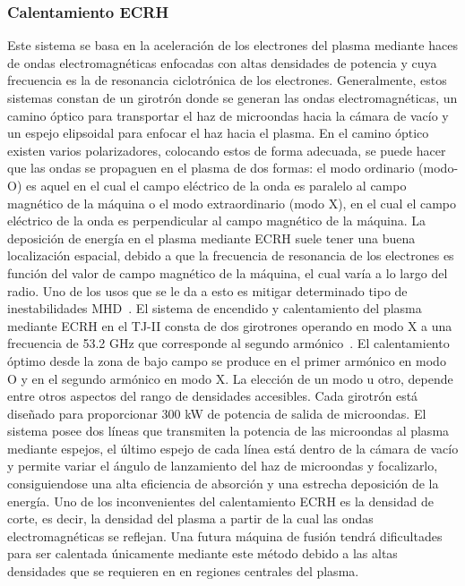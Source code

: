 \subsubsection*{Calentamiento ECRH}
Este sistema se basa en
la aceleración de los electrones del plasma mediante haces de ondas electromagnéticas enfocadas
con altas densidades de potencia y cuya frecuencia es la de resonancia ciclotrónica de
los electrones.
Generalmente, estos sistemas constan de un girotrón donde se generan las ondas electromagnéticas, 
un camino óptico para transportar el haz de microondas hacia la cámara de
vacío y un espejo elipsoidal para enfocar el haz hacia el plasma.
En el camino óptico existen varios polarizadores, colocando estos de forma adecuada, se puede hacer que las ondas se propaguen
en el plasma de dos formas: el modo ordinario (modo-O) es aquel en el cual el campo
eléctrico de la onda es paralelo al campo magnético de la máquina o el modo extraordinario
(modo X), en el cual el campo eléctrico de la onda es perpendicular al campo magnético de
la máquina. La deposición de energía en el plasma mediante ECRH suele tener una buena localización
espacial, debido a que la frecuencia de resonancia de los electrones es función del valor de
campo magnético de la máquina, el cual varía a lo largo del radio. Uno de los usos que se le
da a esto es mitigar determinado
tipo de inestabilidades MHD~\cite{van_den_Brand_2012}.
El sistema de encendido y calentamiento del plasma mediante ECRH en el TJ-II consta de
dos girotrones operando en modo X a una frecuencia de 53.2 GHz que corresponde al segundo
armónico~\cite{Fernandez2001}. El calentamiento óptimo desde la zona de bajo campo se produce en el
primer armónico en modo O y en el segundo armónico en modo X. La elección de un modo
u otro, depende entre otros aspectos del rango de densidades accesibles. Cada girotrón está diseñado
para proporcionar 300 kW de potencia de salida de microondas. El sistema posee dos líneas
que transmiten la potencia de las microondas al plasma mediante espejos, el último espejo
de cada línea está dentro de la cámara de vacío y permite variar el ángulo de lanzamiento
del haz de microondas y focalizarlo, consiguiendose una alta eficiencia de absorción y una
estrecha deposición de la energía.
Uno de los inconvenientes del calentamiento ECRH es la densidad de corte, es decir, la densidad
del plasma a partir de la cual las ondas electromagnéticas se reflejan. Una futura máquina
de fusión tendrá dificultades para ser calentada únicamente mediante este método debido a
las altas densidades que se requieren en en regiones centrales del plasma.
